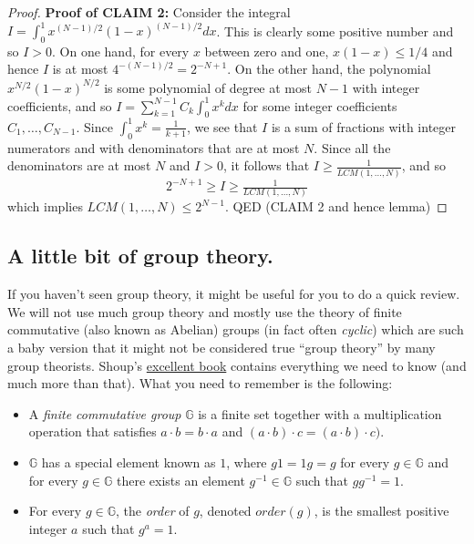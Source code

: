 \begin{proof}
\textbf{Proof of CLAIM 2:} Consider the integral
\(I=\int_0^1 x^{(N-1)/2}(1-x)^{(N-1)/2} dx\). This is clearly some
positive number and so \(I>0\). On one hand, for every \(x\) between
zero and one, \(x(1-x) \leq 1/4\) and hence \(I\) is at most
\(4^{-(N-1)/2}=2^{-N+1}\). On the other hand, the polynomial
\(x^{N/2}(1-x)^{N/2}\) is some polynomial of degree at most \(N-1\) with
integer coefficients, and so \(I=\sum_{k=1}^{N-1} C_k \int_0^1 x^k dx\)
for some integer coefficients \(C_1,\ldots,C_{N-1}\). Since
\(\int_0^1 x^k = \tfrac{1}{k+1}\), we see that \(I\) is a sum of
fractions with integer numerators and with denominators that are at most
\(N\). Since all the denominators are at most \(N\) and \(I>0\), it
follows that \(I \geq \tfrac{1}{LCM(1,\ldots,N)}\), and so
\[2^{-N+1} \geq I \geq \tfrac{1}{LCM(1,\ldots,N)}\] which implies
\(\ensuremath{\mathit{LCM}}(1,\ldots,N) \leq 2^{N-1}\). QED (CLAIM 2 and
hence lemma)

\end{proof}

\subsection{A little bit of group
theory.}\label{A-little-bit-of-group-theory}

If you haven't seen group theory, it might be useful for you to do a
quick review. We will not use much group theory and mostly use the
theory of finite commutative (also known as Abelian) groups (in fact
often \emph{cyclic}) which are such a baby version that it might not be
considered true ``group theory'' by many group theorists. Shoup's
\href{http://www.shoup.net/ntb/}{excellent book} contains everything we
need to know (and much more than that). What you need to remember is the
following:

\begin{itemize}
\item
  A \emph{finite commutative group} \(\mathbb{G}\) is a finite set
  together with a multiplication operation that satisfies
  \(a\cdot b = b\cdot a\) and
  \((a\cdot b)\cdot c = (a\cdot b)\cdot c)\).
\item
  \(\mathbb{G}\) has a special element known as \(1\), where \(g1=1g=g\)
  for every \(g\in\mathbb{G}\) and for every \(g\in \mathbb{G}\) there
  exists an element \(g^{-1}\in \mathbb{G}\) such that \(gg^{-1}=1\).
\item
  For every \(g\in \mathbb{G}\), the \emph{order} of \(g\), denoted
  \(order(g)\), is the smallest positive integer \(a\) such that
  \(g^a=1\).
\end{itemize}

